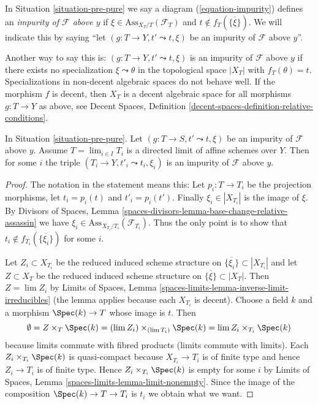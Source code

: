 \begin{definition}
\label{definition-impurity}
In
Situation \ref{situation-pre-pure}
we say a diagram (\ref{equation-impurity}) defines an
{\it impurity of $\mathcal{F}$ above $y$}
if $\xi \in \text{Ass}_{X_T/T}(\mathcal{F}_T)$ and
$t \not \in f_T(\overline{\{\xi\}})$. We will indicate
this by saying ``let $(g : T \to Y, t' \leadsto t, \xi)$ be
an impurity of $\mathcal{F}$ above $y$''.
\end{definition}

\noindent
Another way to say this is: $(g : T \to Y, t' \leadsto t, \xi)$ is
an impurity of $\mathcal{F}$ above $y$ if there exists no specialization
$\xi \leadsto \theta$ in the topological space $|X_T|$ with
$f_T(\theta) = t$. Specializations in non-decent algebraic spaces
do not behave well. If the morphism $f$ is decent, then $X_T$
is a decent algebraic space for all morphisms $g : T \to Y$ as above, see
Decent Spaces, Definition \ref{decent-spaces-definition-relative-conditions}.

\begin{lemma}
\label{lemma-impure-limit}
In Situation \ref{situation-pre-pure}.
Let $(g : T \to S, t' \leadsto t, \xi)$ be an impurity of
$\mathcal{F}$ above $y$. Assume $T = \lim_{i \in I} T_i$ is a directed limit
of affine schemes over $Y$. Then for some $i$ the triple
$(T_i \to Y, t'_i \leadsto t_i, \xi_i)$ is an impurity of
$\mathcal{F}$ above $y$.
\end{lemma}

\begin{proof}
The notation in the statement means this: Let $p_i : T \to T_i$
be the projection morphisms, let $t_i = p_i(t)$ and $t'_i = p_i(t')$.
Finally $\xi_i \in |X_{T_i}|$ is the image of $\xi$. By
Divisors of Spaces, Lemma
\ref{spaces-divisors-lemma-base-change-relative-assassin}
we have $\xi_i \in \text{Ass}_{X_{T_i}/T_i}(\mathcal{F}_{T_i})$.
Thus the only point is to show that
$t_i \not \in f_{T_i}(\overline{\{\xi_i\}})$ for some $i$.

\medskip\noindent
Let $Z_i \subset X_{T_i}$ be the reduced induced scheme structure
on $\overline{\{\xi_i\}} \subset |X_{T_i}|$
and let $Z \subset X_T$ be the reduced induced scheme structure on
$\overline{\{\xi\}} \subset |X_T|$.
Then $Z = \lim Z_i$ by
Limits of Spaces, Lemma \ref{spaces-limits-lemma-inverse-limit-irreducibles}
(the lemma applies because each $X_{T_i}$ is decent).
Choose a field $k$ and a morphism $\Spec(k) \to T$ whose image is $t$.
Then
$$
\emptyset =
Z \times_T \Spec(k) = (\lim Z_i) \times_{(\lim T_i)} \Spec(k)
= \lim Z_i \times_{T_i} \Spec(k)
$$
because limits commute with fibred products (limits commute with limits).
Each $Z_i \times_{T_i} \Spec(k)$ is quasi-compact because $X_{T_i} \to T_i$
is of finite type and hence $Z_i \to T_i$ is of finite type.
Hence $Z_i \times_{T_i} \Spec(k)$ is empty for some $i$ by
Limits of Spaces, Lemma \ref{spaces-limits-lemma-limit-nonempty}.
Since the image of the composition $\Spec(k) \to T \to T_i$ is $t_i$
we obtain what we want.
\end{proof}

